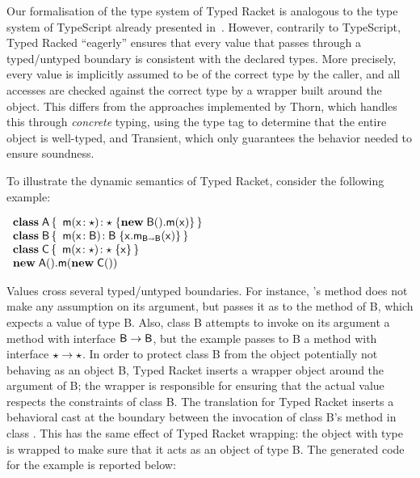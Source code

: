\documentclass[acmlarge, anonymous, authordraft, review]{acmart} %
\begin{document}

Our formalisation of the type system of Typed Racket is analogous to the type system of TypeScript
already presented in~.  However, contrarily to TypeScript, 
Typed Racked ``eagerly'' ensures that every value that passes through a
typed/untyped boundary is consistent with the declared types.  More precisely, every value is implicitly assumed
to be of the correct type by the caller, and all accesses are checked against the correct type by
a wrapper built around the object.  This differs from the approaches implemented by Thorn, which handles
this through \emph{concrete} typing, using the type tag to determine that the
entire object is well-typed, and Transient, which only guarantees the behavior
needed to ensure soundness.  

To illustrate the dynamic semantics of Typed Racket, consider the  following example:

\vspace{2mm}
\(
  \begin{array}{l}
  \Class{\xt A}{}{\Mdef\m\x\any\any{{\Call{\New{\xt B}{}}\m{\x} }}} \\
  \Class{\xt B}{}{\Mdef\m\x{\xt B}{\xt B}{\KCall\x\m\x{\xt B}{\xt B}}} \\
  \Class{\C}{}{\Mdef\m\x{\any}{\any}{\x}} \\
  \Call{\New{\xt A}{}}\m{\New{\C}{}}
  \end{array}
\)
\vspace{2mm}

\noindent Values cross several typed/untyped boundaries.  For instance, \A's method \m does not make any assumption on its argument, but passes it as to the method \n of {\xt B}, which expects a value of type {\xt B}.  Also, class {\xt B} attempts to invoke on its argument a method \m with interface \({{\sf{B}}} \to {{\sf{B}}}\), but the example passes to {\xt B} a method \m with interface \(\star \to \star\).
In order to protect class {\xt B} from the object \C 
potentially not behaving as an object {\xt B}, Typed Racket inserts a wrapper object around the argument of {\xt B}; the wrapper is responsible for ensuring that the actual value respects the constraints of class {\xt B}.
The \kafka translation for Typed Racket inserts a behavioral 
cast at the boundary between the invocation of class {\xt B}'s method \m in class \A.  This has the same effect of Typed Racket wrapping: the object with type \C is wrapped to make sure that it acts as an object of type {\xt B}.
The generated \kafka code for the example is reported below:
\end{document}

